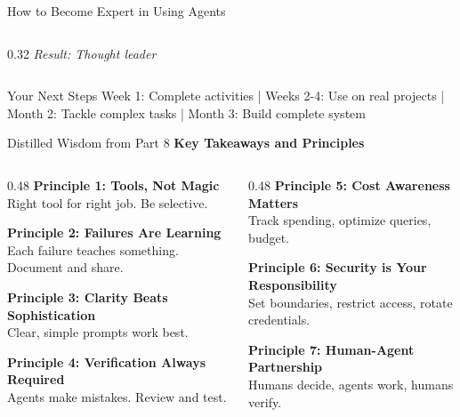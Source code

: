\documentclass[aspectratio=169,11pt]{beamer}
\begin{document}
\begin{frame}{How to Become Expert in Using Agents}
\begin{columns}[T]
\begin{column}{0.32\textwidth}
            \textit{Result: Thought leader}
        \end{column}
    \end{columns}

    \vspace{0.4cm}
    \begin{block}{Your Next Steps}
        Week 1: Complete activities | Weeks 2-4: Use on real projects | Month 2: Tackle complex tasks | Month 3: Build complete system
    \end{block}
\end{frame}

\begin{frame}{Distilled Wisdom from Part 8}
    \textbf{Key Takeaways and Principles}

    \begin{columns}[T]
        \begin{column}{0.48\textwidth}
            \textbf{Principle 1: Tools, Not Magic}\\
            Right tool for right job. Be selective.

            \vspace{0.2cm}
            \textbf{Principle 2: Failures Are Learning}\\
            Each failure teaches something. Document and share.

            \vspace{0.2cm}
            \textbf{Principle 3: Clarity Beats Sophistication}\\
            Clear, simple prompts work best.

            \vspace{0.2cm}
            \textbf{Principle 4: Verification Always Required}\\
            Agents make mistakes. Review and test.
        \end{column}
        \begin{column}{0.48\textwidth}
            \textbf{Principle 5: Cost Awareness Matters}\\
            Track spending, optimize queries, budget.

            \vspace{0.2cm}
            \textbf{Principle 6: Security is Your Responsibility}\\
            Set boundaries, restrict access, rotate credentials.

            \vspace{0.2cm}
            \textbf{Principle 7: Human-Agent Partnership}\\
            Humans decide, agents work, humans verify.


\end{column}
\end{columns}
\end{frame}
\end{document}
